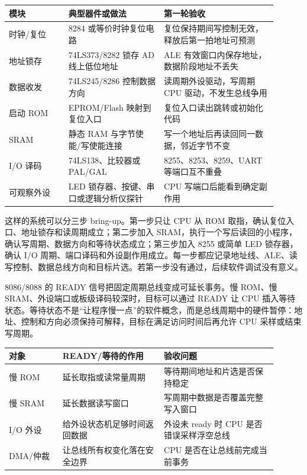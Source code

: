 \begin{longtable}{L{0.2\linewidth}L{0.32\linewidth}L{0.38\linewidth}}
\toprule
模块 & 典型器件或做法 & 第一轮验收 \\
\midrule
时钟/复位 & 8284 或等价时钟复位电路 & 复位保持期间写控制无效，释放后第一拍地址可预测 \\
地址锁存 & 74LS373/8282 锁存 AD 线上低位地址 & ALE 有效窗口内保存地址，数据阶段地址不丢失 \\
数据收发 & 74LS245/8286 控制数据方向 & 读周期外设驱动，写周期 CPU 驱动，不发生总线争用 \\
启动 ROM & EPROM/Flash 映射到复位入口 & 复位入口读出跳转或初始化代码 \\
SRAM & 静态 RAM 与字节使能/写使能连接 & 写一个地址后再读回同一数据，邻近字节不变 \\
I/O 译码 & 74LS138、比较器或 PAL/GAL & 8255、8253、8259、UART 等端口互不重叠 \\
可观察外设 & LED 锁存器、按键、串口或逻辑分析仪探针 & CPU 写端口后能看到确定副作用 \\
\bottomrule
\end{longtable}

这样的系统可以分三步 bring-up。第一步只让 CPU 从 ROM 取指，确认复位入口、地址锁存和读周期成立；第二步加入 SRAM，执行一个写后读回的小程序，确认写周期、数据方向和等待状态成立；第三步加入 8255 或简单 LED 锁存器，确认 I/O 周期、端口译码和外设副作用成立。每一步都应记录地址线、ALE、读写控制、数据总线方向和目标片选。若第一步没有通过，后续软件调试没有意义。

8086/8088 的 READY 信号把固定周期总线变成可延长事务。慢 ROM、慢 SRAM、外设端口或板级译码较深时，目标可以通过 READY 让 CPU 插入等待状态。等待状态不是“让程序慢一点”的软件概念，而是总线周期中的硬件暂停：地址、控制和方向必须保持可解释，目标在满足访问时间后再允许 CPU 采样或结束写周期。

\begin{longtable}{L{0.18\linewidth}L{0.34\linewidth}L{0.38\linewidth}}
\toprule
对象 & READY/等待的作用 & 验收问题 \\
\midrule
慢 ROM & 延长取指或读常量周期 & 等待期间地址和片选是否保持稳定 \\
慢 SRAM & 延长数据读写窗口 & 写周期中数据是否覆盖完整写入窗口 \\
I/O 外设 & 给外设状态机足够时间返回数据 & 外设未 ready 时 CPU 是否错误采样浮空总线 \\
DMA/仲裁 & 让总线所有权变化落在安全边界 & CPU 是否在让总线前完成当前事务 \\
\bottomrule
\end{longtable}

